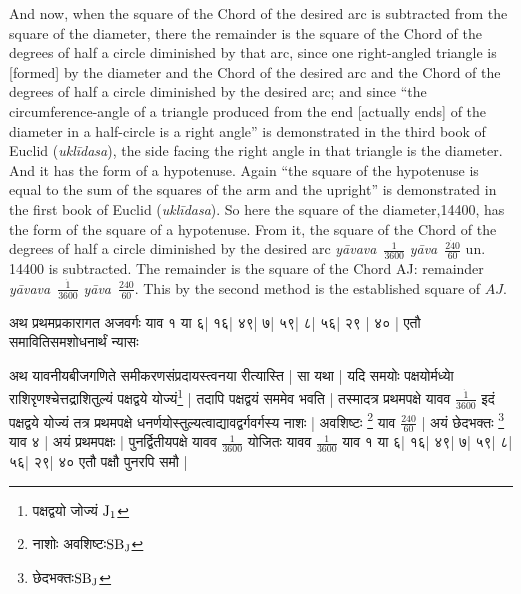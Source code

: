 \documentclass[11pt,a5paper]{book}
\def\yava{\textit{y\=ava}}
\def\yavava{\textit{y\=avava}}
\def\nl{\hfill\break}
\begin{document}
\newpage
And now, when the square of the Chord of the desired arc is subtracted from the square of the
diameter, there the remainder  is the square of the Chord of the degrees 
of half a circle diminished by that arc, since one right-angled triangle is [formed] by the diameter
and the Chord of the desired arc and the Chord of the degrees of half a circle diminished by the desired arc; 
and since ``the circumference-angle of a triangle produced from the end [actually ends] of the diameter 
in a half-circle is a right angle'' is demonstrated in the third book of Euclid (\textit{uklīdasa}), 
the side facing the right angle in that triangle is the diameter. And it 
has the form of a hypotenuse. Again ``the square of the hypotenuse
is equal to the sum of the squares of the arm and the upright'' is demonstrated in the first book of Euclid (\textit{uklīdasa}). 
So here the square of the diameter,14400, has the form of the square of a hypotenuse. From it, the square of the Chord of the 
degrees of half a circle diminished by the desired arc \yavava\ $\frac{1}{3600}$ \yava\ $\frac{\dot{240}}{60}$ un. 14400 is subtracted. 
The remainder is the square of the Chord AJ: 
remainder \yavava\ $\frac{\dot{1}}{3600}$ \yava\ $\frac{240}{60}$.
This by the second method is the established square of $AJ$.

\newpage

{\s अथ प्रथमप्रकारागत अजवर्गः याव १ या ६| १६| ४९| ७| ५९| ८| ५६| २९ | ४० |
एतौ समावितिसमशोधनार्थं न्यासः

अथ यावनीयबीजगणिते समीकरणसंप्रदायस्त्वनया रीत्यास्ति |
सा यथा |
यदि समयोः पक्षयोर्मध्येा राशिरृण\-श्चेत्तद्राशितुल्यं 
पक्षद्वये योज्यं\footnote{{\s पक्षद्वयो जोज्यं }${\rm J_1}$} |
तदापि पक्षद्वयं सममेव भवति |
तस्मादत्र प्रथमपक्षे यावव %
$\frac{\dot{1}}{3600}$
इदं पक्षद्वये योज्यं तत्र प्रथमपक्षे
धनर्णयोस्तुल्यत्वाद्यावद्वर्गवर्गस्य नाशः | अवशिष्टः \footnote{{\s नाशोः अवशिष्टः}${\rm SB_J}$}
याव $\frac{240}{60}$ |
अयं छेदभक्तः \footnote{{\s छेदभक्तः}${\rm SB_J}$} याव ४ | अयं प्रथमपक्षः | पुनर्द्वितीयपक्षे
यावव $\frac{1}{3600}$ योजितः यावव $\frac{1}{3600}$
याव १ या ६| १६| ४९| ७| ५९| ८| ५६| २९| ४०
एतौ पक्षौ पुनरपि समौ |
}
\newpage
\end{document}
